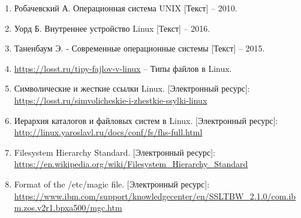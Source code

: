 \begin{enumerate}
	\item Робачевский А. Операционная система UNIX [Текст] -- 2010.
	\item Уорд Б. Внутреннее устройство Linux [Текст] -- 2016.
	\item Таненбаум Э. - Современные операционные системы [Текст] -- 2015.
	\item \url{https://losst.ru/tipy-fajlov-v-linux} -- Типы файлов в Linux.
	\item Символические и жесткие ссылки Linux. [Электронный ресурс]:\\
		\url{https://losst.ru/simvolicheskie-i-zhestkie-ssylki-linux}
	\item Иерархия каталогов и файловых систем в Linux. [Электронный ресурс]:\\
		\url{http://linux.yaroslavl.ru/docs/conf/fs/fhs-full.html}
	\item Filesystem Hierarchy Standard. [Электронный ресурс]:\\
		\url{https://en.wikipedia.org/wiki/Filesystem_Hierarchy_Standard}
	\item Format of the /etc/magic file. [Электронный ресурс]:\\
		\url{https://www.ibm.com/support/knowledgecenter/en/SSLTBW_2.1.0/com.ibm.zos.v2r1.bpxa500/mgc.htm}
\end{enumerate}

